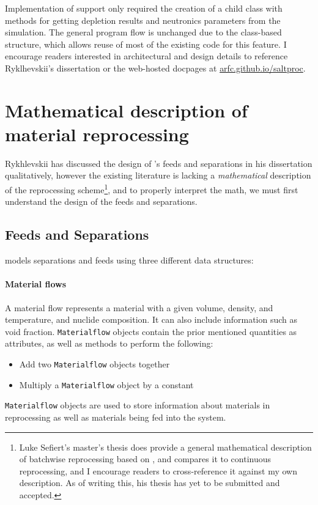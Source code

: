 Implementation of \OpenMC support only required the creation of a child class
with methods for getting depletion results and neutronics parameters from the
\OpenMC simulation. The general program flow is unchanged due to the
class-based structure, which allows reuse of most of the existing code for
this feature. I encourage readers interested in architectural and design
details to reference Ryklhevskii's dissertation \cite{rykhlevskii_fuel_2020}
or the web-hosted \SaltProc docpages at \url{arfc.github.io/saltproc}.


\section{Mathematical description of material reprocessing}
Rykhlevskii has discussed the design of \SaltProc's feeds and separations in
his dissertation qualitatively, however the existing \SaltProc literature is lacking a {\it mathematical} description of the reprocessing scheme\footnote{Luke Sefiert's master's thesis does provide a general
mathematical description of batchwise reprocessing based on \SaltProc, and
compares it to continuous reprocessing, and I encourage readers to
cross-reference it against my own description. As of writing this, his thesis
has yet to be submitted and accepted.}, and to properly interpret the math, we
must first understand the design of the feeds and separations.

\subsection{Feeds and Separations}
\label{sub:feeds-separations}
\SaltProc models separations and feeds using three different data structures:

\paragraph{Material flows}
    A material flow represents a material with a given
    volume, density, and temperature, and nuclide composition.
    It can also include information such as void fraction. \verb.Materialflow.
    objects contain the prior mentioned quantities as attributes, as well as
    methods to perform the following:
    \begin{itemize}
        \item Add two \verb.Materialflow. objects together
        \item Multiply a \verb.Materialflow. object by a constant
    \end{itemize}
    \verb.Materialflow. objects are used to store information about materials
    in reprocessing as well as materials being fed into the system.

